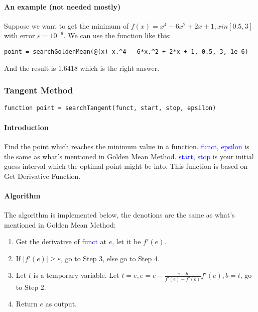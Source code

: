 \documentclass{article}
\begin{document}
\paragraph{An example (not needed mostly)}
Suppose we want to get the minimum of $f(x) = x^4 - 6x^2 + 2x + 1, x in [0.5, 3]$ with error $\varepsilon = 10^{-6}$. We can use the function like this:
\begin{verbatim}
point = searchGoldenMean(@(x) x.^4 - 6*x.^2 + 2*x + 1, 0.5, 3, 1e-6)
\end{verbatim}

And the result is $1.6418$ which is the right answer.

\subsubsection{Tangent Method}
\begin{verbatim}
function point = searchTangent(funct, start, stop, epsilon)
\end{verbatim}

\paragraph{Introduction}
Find the point which reaches the minimum value in a function. \textcolor{blue}{funct, epsilon} is the same as what's mentioned in Golden Mean Method. \textcolor{blue}{start, stop} is your initial guess interval which the optimal point might be into. This function is based on Get Derivative Function.

\paragraph{Algorithm}
The algorithm is implemented below, the denotions are the same as what's mentioned in Golden Mean Method:
\begin{enumerate}
    \item Get the derivative of \textcolor{blue}{funct} at $e$, let it be $f'(e)$.
    \item If $|f'(e)| \geqslant \varepsilon$, go to Step 3, else go to Step 4.
    \item Let $t$ is a temporary variable. Let $t = e, e = e - \frac{e - b}{f'(e) - f'(b)} f'(e), b = t$, go to Step 2.
    \item Return $e$ as output.
\end{enumerate}
\end{document}
